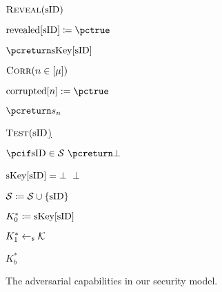 \begin{figure}[h!]
{{\begin{minipage}[t]{0.4\textwidth}
\underline{$\textsc{Reveal}(\text{sID})$}
\begin{nicodemus}
	\item $\revealed[\sID] \coloneqq \pctrue$
	\item $\pcreturn \skeys[\sID]$	\\	
\end{nicodemus}

\underline{$\textsc{Corr}(n \in [\mu])$}
\begin{nicodemus}
	\item $\corrupted[n] := \pctrue$
	\item $\pcreturn \ssk_n$\\
\end{nicodemus}

\underline{$\textsc{Test}(\text{sID}$)}
\begin{nicodemus}
	\item $\pcif \sid\in\testSessions~ \pcreturn \bot$ 
	\item \pcif $\text{sKey}[\text{sID}] = \bot$~\pcreturn $\bot$
	\item $\mathcal{S} \coloneqq \mathcal{S} \cup \{\text{sID}\}$
	\item $K_0^* \coloneqq \text{sKey}[\text{sID}]$
	\item $K_1^* \gets_{\scriptscriptstyle\$} \mathcal{K}$
	\item \pcreturn $K_b^*$
\end{nicodemus}
\end{minipage}
	}}
	\caption{The adversarial capabilities in our security model.}
	\label{fig:giake-adversary}
\end{figure}

